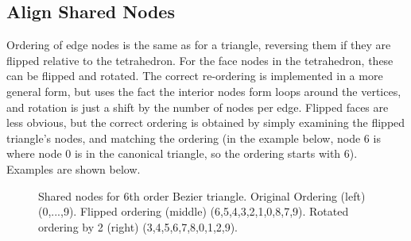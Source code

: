 \documentclass{article}
\begin{document}
\subsection{Align Shared Nodes}
Ordering of edge nodes is the same as for a triangle, reversing them if they are flipped relative to the tetrahedron. For the face nodes in the tetrahedron, these can be flipped and rotated. The correct re-ordering is implemented in a more general form, but uses the fact the interior nodes form loops around the vertices, and rotation is just a shift by the number of nodes per edge. Flipped faces are less obvious, but the correct ordering is obtained by simply examining the flipped triangle's nodes, and matching the ordering (in the example below, node 6 is where node 0 is in the canonical triangle, so the ordering starts with 6). Examples are shown below.
\begin{figure}[!ht]
\hspace{0.5cm}
\hspace{0.5cm}
\caption{Shared nodes for 6th order Bezier triangle. Original Ordering (left) (0,...,9). Flipped ordering (middle) (6,5,4,3,2,1,0,8,7,9). Rotated ordering by 2 (right) (3,4,5,6,7,8,0,1,2,9).}
\end{figure}
\end{document}
